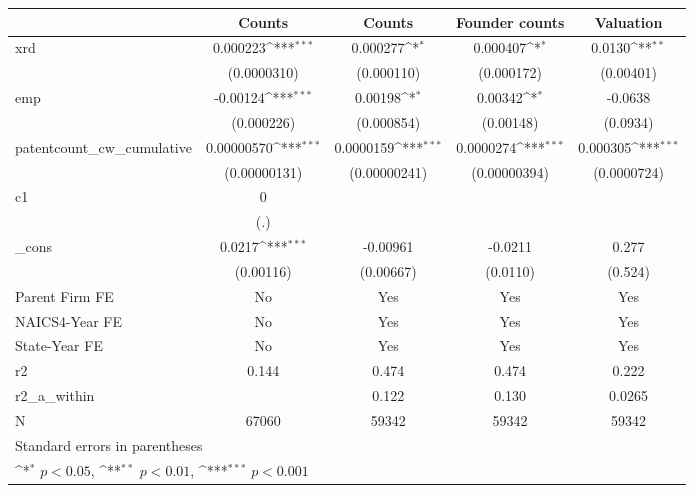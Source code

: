 {
\def\sym#1{\ifmmode^{#1}\else\(^{#1}\)\fi}
\begin{tabular}{l*{4}{c}}
\hline\hline
            &\multicolumn{1}{c}{Counts}&\multicolumn{1}{c}{Counts}&\multicolumn{1}{c}{Founder counts}&\multicolumn{1}{c}{Valuation}\\
\hline
xrd         &    0.000223\sym{***}&    0.000277\sym{*}  &    0.000407\sym{*}  &      0.0130\sym{**} \\
            & (0.0000310)         &  (0.000110)         &  (0.000172)         &   (0.00401)         \\
[1em]
emp         &    -0.00124\sym{***}&     0.00198\sym{*}  &     0.00342\sym{*}  &     -0.0638         \\
            &  (0.000226)         &  (0.000854)         &   (0.00148)         &    (0.0934)         \\
[1em]
patentcount\_cw\_cumulative&  0.00000570\sym{***}&   0.0000159\sym{***}&   0.0000274\sym{***}&    0.000305\sym{***}\\
            &(0.00000131)         &(0.00000241)         &(0.00000394)         & (0.0000724)         \\
[1em]
c1          &           0         &                     &                     &                     \\
            &         (.)         &                     &                     &                     \\
[1em]
\_cons      &      0.0217\sym{***}&    -0.00961         &     -0.0211         &       0.277         \\
            &   (0.00116)         &   (0.00667)         &    (0.0110)         &     (0.524)         \\
[1em]
Parent Firm FE&          No         &         Yes         &         Yes         &         Yes         \\
[1em]
NAICS4-Year FE&          No         &         Yes         &         Yes         &         Yes         \\
[1em]
State-Year FE&          No         &         Yes         &         Yes         &         Yes         \\
\hline
r2          &       0.144         &       0.474         &       0.474         &       0.222         \\
r2\_a\_within &                     &       0.122         &       0.130         &      0.0265         \\
N           &       67060         &       59342         &       59342         &       59342         \\
\hline\hline
\multicolumn{5}{l}{\footnotesize Standard errors in parentheses}\\
\multicolumn{5}{l}{\footnotesize \sym{*} \(p<0.05\), \sym{**} \(p<0.01\), \sym{***} \(p<0.001\)}\\
\end{tabular}
}
